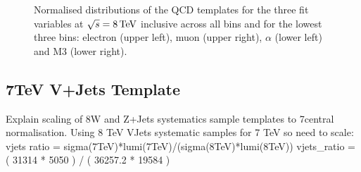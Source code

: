 \begin{figure}[hbtp]
	 \caption{Normalised distributions of the QCD templates for the three fit variables at $\sqrt{s}=8\,\text{Te\hspace{-.08em}V}$
	 inclusive across all \met bins and for the lowest three \met bins: electron \abseta (upper
	 left), muon \abseta (upper right), $\alpha$ (lower left) and M3 (lower right).}
     \label{fig:fit_variable_qcd_comparisons_8TeV}
\end{figure}


\subsection{7TeV V+Jets Template}
\label{ss:7TeV_vplusjets_template}
Explain scaling of 8\TeV W and Z+Jets systematics sample templates to 7\TeV central normalisation.
    Using 8 TeV VJets systematic samples for 7 TeV so need to scale:
    vjets ratio = sigma(7TeV)*lumi(7TeV)/(sigma(8TeV)*lumi(8TeV))
    vjets\_ratio = ( 31314 * 5050 ) / ( 36257.2 * 19584 )

